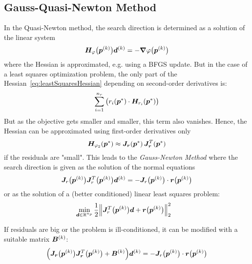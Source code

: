 		\subsection{Gauss-Quasi-Newton Method}
			In the Quasi-Newton method, the search direction is determined as a solution of the linear system
			\begin{align*}
				\bm{H}_\varphi\big(\bm{p}^{(k)}\big) \bm{d}^{(k)} = -\grad{\varphi}\big(\bm{p}^{(k)}\big)
			\end{align*}
			where the Hessian is approximated, e.g. using a BFGS update. But in the case of a least squares optimization problem, the only part of the Hessian~\eqref{eq:leastSquaresHessian} depending on second-order derivatives is:
			\begin{align*}
				\sum_{i = 1}^{n_r} \big( r_i(\bm{p}^\ast) \cdot \bm{H}_{r_i}(\bm{p}^\ast) \big)
			\end{align*}
			But as the objective gets smaller and smaller, this term also vanishes. Hence, the Hessian can be approximated using first-order derivatives only
			\begin{align*}
				\bm{H}_{\varphi_2}(\bm{p}^\ast) \approx \bm{J}_{\bm{r}}(\bm{p}^\ast) \, \bm{J}_{\bm{r}}^T(\bm{p}^\ast)
			\end{align*}
			if the residuals are "small". This leads to the \emph{Gauss-Newton Method} where the search direction is given as the solution of the normal equations
			\begin{align*}
				\bm{J}_r\big(\bm{p}^{(k)}\big) \bm{J}_r^T\big(\bm{p}^{(k)}\big) \bm{d}^{(k)} = -\bm{J}_r\big(\bm{p}^{(k)}\big) \cdot \bm{r}\big(\bm{p}^{(k)}\big)
			\end{align*}
			or as the solution of a (better conditioned) linear least squares problem:
			\begin{align*}
				\min_{\bm{d} \in \mathbb{R}^{n_p}} &\, \frac{1}{2} \Big\lVert \bm{J}_r^T\big(\bm{p}^{(k)}\big) \bm{d} + \bm{r}\big(\bm{p}^{(k)}\big) \Big\rVert_2^2
			\end{align*}

			If residuals are big or the problem is ill-conditioned, it can be modified with a suitable matrix \( \bm{B}^{(k)} \):
			\begin{align*}
				\Big( \bm{J}_{\bm{r}}\big(\bm{p}^{(k)}\big) \bm{J}_{\bm{r}}^T\big(\bm{p}^{(k)}\big) + \bm{B}^{(k)} \Big) \bm{d}^{(k)} = -\bm{J}_r\big(\bm{p}^{(k)}\big) \cdot \bm{r}\big(\bm{p}^{(k)}\big)
			\end{align*}

